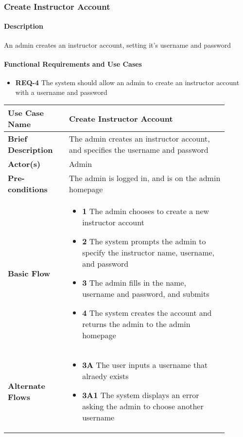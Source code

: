 \documentclass{article}
\begin{document}
\subsubsection{Create Instructor Account}

\paragraph{Description} An admin creates an instructor account, setting it's username and password


\paragraph{Functional Requirements and Use Cases}

\begin{itemize}
  \item \textbf{REQ-4} The system should allow an admin to create an instructor account with a username and password
\end{itemize}

\vspace{0.1in}

\begin{tabular}{| p{0.25\linewidth} | p{0.65\linewidth} |}
  \hline
  \textbf{Use Case Name} & Create Instructor Account \\
  \hline
  \textbf{Brief Description} & The admin creates an instructor account, and specifies the username and password \\
  \hline
  \textbf{Actor(s)} & Admin \\
  \hline
  \textbf{Pre-conditions} & The admin is logged in, and is on the admin homepage\\
  \hline
  \textbf{Basic Flow} & \begin{itemize}
    \item[] \textbf{1} The admin chooses to create a new instructor account
    \item[] \textbf{2} The system prompts the admin to specify the instructor name, username, and password
    \item[] \textbf{3} The admin fills in the name, username and password, and submits
    \item[] \textbf{4} The system creates the account and returns the admin to the admin homepage
  \end{itemize}\\
  \hline
  \textbf{Alternate Flows} & \begin{itemize}
    \item[] \textbf{3A} The user inputs a username that alraedy exists
    \item[] \textbf{3A1} The system displays an error asking the admin to choose another username
  \end{itemize} \\
  \hline
\end{tabular}
\end{document}
